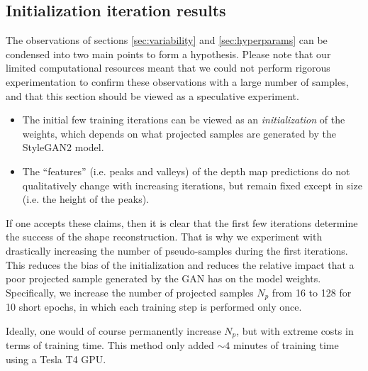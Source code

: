 \newpage

\subsection{Initialization iteration results}
\label{app:init-iter}
 The observations of sections \ref{sec:variability} and \ref{sec:hyperparams} can be condensed into two main points to form a hypothesis. Please note that our limited computational resources meant that we could not perform rigorous experimentation to confirm these observations with a large number of samples, and that this section should be viewed as a speculative experiment.

\begin{itemize}
    \item The initial few training iterations can be viewed as an \textit{initialization} of the weights, which depends on what projected samples are generated by the StyleGAN2 model.
    
    \item The ``features'' (i.e. peaks and valleys) of the depth map predictions do not qualitatively change with increasing iterations, but remain fixed except in size (i.e. the height of the peaks).
\end{itemize}

If one accepts these claims, then it is clear that the first few iterations determine the success of the shape reconstruction. That is why we experiment with drastically increasing the number of pseudo-samples during the first iterations. This reduces the bias of the initialization and reduces the relative impact that a poor projected sample generated by the GAN has on the model weights. Specifically, we increase the number of projected samples $N_{p}$ from 16 to 128 for 10 short epochs, in which each training step is performed only once. 

Ideally, one would of course permanently increase $N_{p}$, but with extreme costs in terms of training time. This method only added $\sim4$ minutes of training time using a Tesla T4 GPU.


